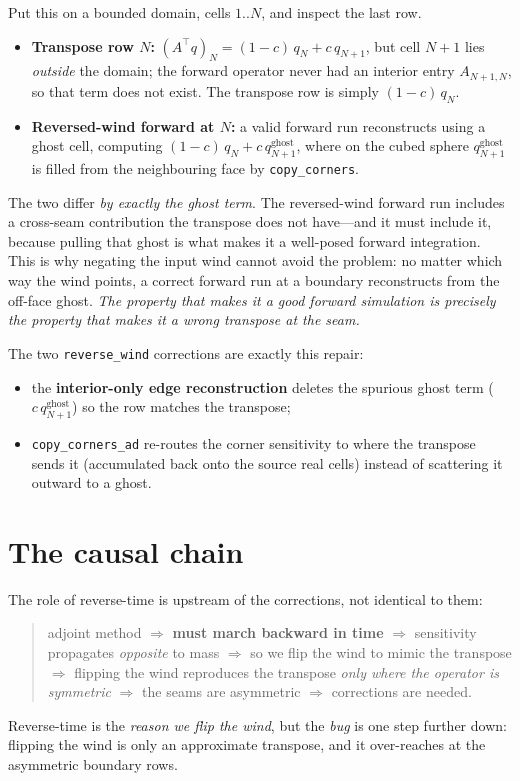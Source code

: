 \documentclass[11pt]{article}
\newcommand{\code}[1]{\texttt{#1}}
\begin{document}
Put this on a bounded domain, cells $1..N$, and inspect the last row.
\begin{itemize}
  \item \textbf{Transpose row $N$:} $(A^\top q)_N = (1-c)\,q_N + c\,q_{N+1}$, but
  cell $N+1$ lies \emph{outside} the domain; the forward operator never had an
  interior entry $A_{N+1,N}$, so that term does not exist. The transpose row is
  simply $(1-c)\,q_N$.
  \item \textbf{Reversed-wind forward at $N$:} a valid forward run reconstructs
  using a ghost cell, computing $(1-c)\,q_N + c\,q_{N+1}^{\text{ghost}}$, where on
  the cubed sphere $q_{N+1}^{\text{ghost}}$ is filled from the neighbouring face
  by \code{copy\_corners}.
\end{itemize}
The two differ \emph{by exactly the ghost term}. The reversed-wind forward run
includes a cross-seam contribution the transpose does not have---and it must
include it, because pulling that ghost is what makes it a well-posed forward
integration. This is why negating the input wind cannot avoid the problem: no
matter which way the wind points, a correct forward run at a boundary
reconstructs from the off-face ghost. \emph{The property that makes it a good
forward simulation is precisely the property that makes it a wrong transpose at
the seam.}

The two \code{reverse\_wind} corrections are exactly this repair:
\begin{itemize}
  \item the \textbf{interior-only edge reconstruction} deletes the spurious ghost
  term ($c\,q_{N+1}^{\text{ghost}}$) so the row matches the transpose;
  \item \code{copy\_corners\_ad} re-routes the corner sensitivity to where the
  transpose sends it (accumulated back onto the source real cells) instead of
  scattering it outward to a ghost.
\end{itemize}

\section{The causal chain}

The role of reverse-time is upstream of the corrections, not identical to them:
\begin{quote}
adjoint method $\Rightarrow$ \textbf{must march backward in time} $\Rightarrow$
sensitivity propagates \emph{opposite} to mass $\Rightarrow$ so we flip the wind
to mimic the transpose $\Rightarrow$ flipping the wind reproduces the transpose
\emph{only where the operator is symmetric} $\Rightarrow$ the seams are
asymmetric $\Rightarrow$ corrections are needed.
\end{quote}
Reverse-time is the \emph{reason we flip the wind}, but the \emph{bug} is one step
further down: flipping the wind is only an approximate transpose, and it
over-reaches at the asymmetric boundary rows.
\end{document}
